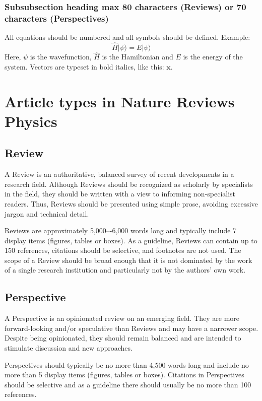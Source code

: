 \documentclass[fleqn,10pt]{wlscirep}
\begin{document}
\subsubsection*{Subsubsection heading max 80 characters (Reviews) or 70 characters (Perspectives)}
All equations should be numbered and all symbols should be defined. Example:
\begin{equation}\label{eq}
\hat{H} |\psi \rangle = E |\psi \rangle
\end{equation}
Here, $\psi$ is the wavefunction, $\hat{H}$ is the Hamiltonian and $E$ is the energy of the system. Vectors are typeset in bold italics, like this: $\bm{x}$.
\section*{Article types in Nature Reviews Physics}
\subsection*{Review}
A Review\cite{Review} is an authoritative, balanced survey of recent developments in a research field. Although Reviews should be recognized as scholarly by specialists in the field, they should be written with a view to informing non-specialist readers. Thus, Reviews should be presented using simple prose, avoiding excessive jargon and technical detail.

Reviews are approximately 5,000–-6,000 words long and typically include 7 display items (figures, tables or boxes). As a guideline, Reviews can contain up to 150 references, citations should be selective, and footnotes are not used. The scope of a Review should be broad enough that it is not dominated by the work of a single research institution and particularly not by the authors' own work.
\subsection*{Perspective}

A Perspective\cite{Perspective} is an opinionated review on an emerging field. They are more forward-looking and/or speculative than Reviews and may have a narrower scope. Despite being opinionated, they should remain balanced and are intended to stimulate discussion and new approaches.

Perspectives should typically be no more than 4,500 words long and include no more than 5 display items (figures, tables or boxes). Citations in Perspectives should be selective and as a guideline there should usually be no more than 100 references. 
\end{document}
